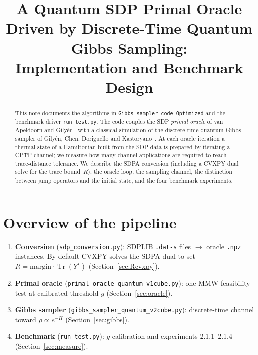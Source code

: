 \documentclass[11pt]{article}
\title{A Quantum SDP Primal Oracle Driven by Discrete-Time Quantum
Gibbs Sampling:\\ Implementation and Benchmark Design}
\author{}
\date{}
\newcommand{\Tr}{\operatorname{Tr}}
\begin{document}
\maketitle

\begin{abstract}
This note documents the algorithms in \texttt{Gibbs sampler code Optimized} and
the benchmark driver \texttt{run\_test.py}. The code couples the SDP
\emph{primal oracle} of van Apeldoorn and Gily\'en~\cite{vAG2019} with a
classical simulation of the discrete-time quantum Gibbs sampler of Gily\'en,
Chen, Doriguello and Kastoryano~\cite{GCDK2024}. At each oracle iteration a
thermal state of a Hamiltonian built from the SDP data is prepared by iterating
a CPTP channel; we measure how many channel applications are required to reach
trace-distance tolerance. We describe the SDPA conversion (including a CVXPY
dual solve for the trace bound~$R$), the oracle loop, the sampling channel, the
distinction between jump operators and the initial state, and the four benchmark
experiments.
\end{abstract}

\tableofcontents

\section{Overview of the pipeline}

\begin{enumerate}
  \item \textbf{Conversion} (\texttt{sdp\_conversion.py}): SDPLIB \texttt{.dat-s}
  files $\to$ oracle \texttt{.npz} instances. By default CVXPY solves the SDPA
  dual to set $R=\text{margin}\cdot\Tr(Y^\star)$ (Section~\ref{sec:Rcvxpy}).
  \item \textbf{Primal oracle} (\texttt{primal\_oracle\_quantum\_v1cube.py}):
  one MMW feasibility test at calibrated threshold $g$
  (Section~\ref{sec:oracle}).
  \item \textbf{Gibbs sampler} (\texttt{gibbs\_sampler\_quantum\_v2cube.py}):
  discrete-time channel toward $\rho\propto e^{-H}$ (Section~\ref{sec:gibbs}).
  \item \textbf{Benchmark} (\texttt{run\_test.py}): $g$-calibration and
  experiments 2.1.1--2.1.4 (Section~\ref{sec:measure}).
\end{enumerate}
\end{document}
